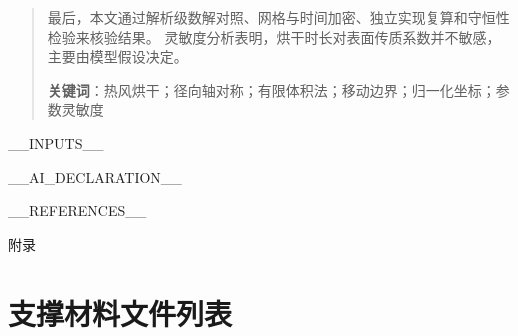 \documentclass[12pt,a4paper]{ctexart}
\begin{document}
\begin{abstract}
\begin{small}
最后，本文通过解析级数解对照、网格与时间加密、独立实现复算和守恒性检验来核验结果。
灵敏度分析表明，烘干时长对表面传质系数并不敏感，主要由模型假设决定。



\noindent\textbf{关键词}：热风烘干；径向轴对称；有限体积法；移动边界；归一化坐标；参数灵敏度
\end{small}
\end{abstract}

\newpage

__INPUTS__

__AI_DECLARATION__

\begin{thebibliography}{99}
__REFERENCES__
\end{thebibliography}

\clearpage

\begin{center}
  \heiti{} 附录
\end{center}

\appendix
\section{支撑材料文件列表}
\end{document}
